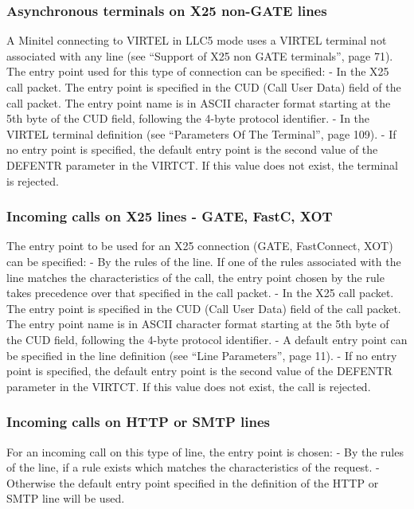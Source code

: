 \documentclass[letterpaper,10pt,english]{sphinxmanual}
\begin{document}
\subsubsection{Asynchronous terminals on X25 non-GATE lines}
\label{\detokenize{connectivity_guide:asynchronous-terminals-on-x25-non-gate-lines}}
A Minitel connecting to VIRTEL in LLC5 mode uses a VIRTEL terminal not associated with any line (see “Support of X25 non GATE terminals”, page 71). The entry point used for this type of connection can be specified:
- In the X25 call packet. The entry point is specified in the CUD (Call User Data) field of the call packet. The entry point name is in ASCII character format starting at the 5th byte of the CUD field, following the 4-byte protocol identifier.
- In the VIRTEL terminal definition (see “Parameters Of The Terminal”, page 109).
- If no entry point is specified, the default entry point is the second value of the DEFENTR parameter in the VIRTCT. If this value does not exist, the terminal is rejected.


\subsubsection{Incoming calls on X25 lines - GATE, FastC, XOT}
\label{\detokenize{connectivity_guide:incoming-calls-on-x25-lines-gate-fastc-xot}}
The entry point to be used for an X25 connection (GATE, FastConnect, XOT) can be specified:
- By the rules of the line. If one of the rules associated with the line matches the characteristics of the call, the entry point chosen by the rule takes precedence over that specified in the call packet.
- In the X25 call packet. The entry point is specified in the CUD (Call User Data) field of the call packet. The entry point name is in ASCII character format starting at the 5th byte of the CUD field, following the 4-byte protocol identifier.
- A default entry point can be specified in the line definition (see “Line Parameters”, page 11).
- If no entry point is specified, the default entry point is the second value of the DEFENTR parameter in the VIRTCT. If this value does not exist, the call is rejected.


\subsubsection{Incoming calls on HTTP or SMTP lines}
\label{\detokenize{connectivity_guide:incoming-calls-on-http-or-smtp-lines}}
For an incoming call on this type of line, the entry point is chosen:
- By the rules of the line, if a rule exists which matches the characteristics of the request.
- Otherwise the default entry point specified in the definition of the HTTP or SMTP line will be used.
\end{document}
